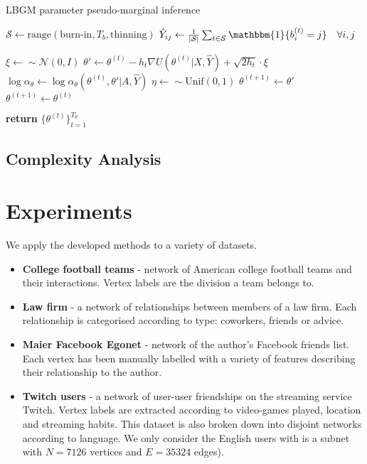 \documentclass{article}
\newcommand{\one}{\mathbbm{1}}
\newcommand{\Gaussian}{\mathcal{N}}
\begin{document}
\begin{algorithm} %
	\caption{LBGM parameter pseudo-marginal inference} %
	\label{alg:theta-samples} %
	\begin{algorithmic} %
		
		\STATE $\mathcal{S} \gets \textrm{range}(\textrm{burn-in}, T_b, \textrm{thinning})$
		\STATE $\hat{Y}_{ij} \gets \frac{1}{\mathcal{|S|}} \sum_{t \in \mathcal{S}} \one \{ b^{(t)}_i = j\} \quad \forall i,j$
		
		\item[]
		
		\STATE $\xi \gets \sim \Gaussian(0, I)$
		\STATE $\theta' \gets \theta^{(t)} - h_t \nabla U(\theta^{(t)} | X, \hat{Y}) + \sqrt{2h_t} \cdot \xi$
		\STATE $\log \alpha_\theta \gets \log \alpha_\theta(\theta^{(t)}, \theta' | A, \hat{Y})$
		\STATE $\eta \gets \sim \textrm{Unif}(0,1)$
		\IF{$\log \eta < \log \alpha_\theta$}
		\STATE $\theta^{(t+1)} \gets \theta'$
		\ELSE
		\STATE $\theta^{(t+1)} \gets \theta^{(t)}$
		\ENDIF
		\ENDFOR
		
		\STATE \textbf{return} $\{\theta^{(t)}\}_{t=1}^{T_\theta}$
		
	\end{algorithmic}
\end{algorithm}

\subsection{Complexity Analysis}

\section{Experiments}

We apply the developed methods to a variety of datasets.

\begin{itemize}
	\item \textbf{College football teams} \cite{Evans_2010_football} - network of American college football teams and their interactions. Vertex labels are the division a team belongs to.
	\item \textbf{Law firm} \cite{LawFirm} - a network of relationships between members of a law firm. Each relationship is categorised according to type: coworkers, friends or advice.
	\item \textbf{Maier Facebook Egonet} \cite{FB-Maier} - network of the author's Facebook friends list. Each vertex has been manually labelled with a variety of features describing their relationship to the author.
	\item \textbf{Twitch users} \cite{twitch} - a network of user-user friendships on the streaming service Twitch. Vertex labels are extracted according to video-games played, location and streaming habits. This dataset is also broken down into disjoint networks according to language. We only consider the English users with is a subnet with $N=7126$ vertices and $E=35324$ edges).
\end{itemize}
\end{document}
